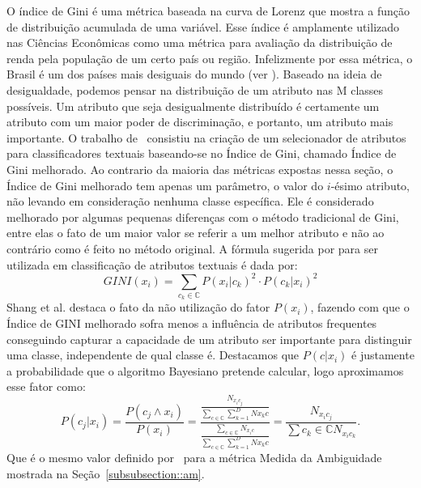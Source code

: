 O índice de Gini é uma métrica baseada na curva de Lorenz que mostra a função de distribuição acumulada de uma variável. Esse índice é amplamente utilizado nas Ciências Econômicas como uma métrica para avaliação da distribuição de renda pela população de um certo país ou região. Infelizmente por essa métrica, o Brasil é um dos países mais desiguais do mundo (ver \cite{cia-gini}). 
Baseado na ideia de desigualdade, podemos pensar na distribuição de um atributo nas M classes possíveis. Um atributo que seja desigualmente distribuído é certamente um atributo com um maior poder de discriminação, e portanto, um atributo mais importante. O trabalho de~\cite{Shang07} consistiu na criação de um selecionador de atributos para classificadores textuais baseando-se no Índice de Gini, chamado Índice de Gini melhorado. Ao contrario da maioria das métricas expostas nessa seção, o Índice de Gini melhorado tem apenas um parâmetro, o valor do $i$-ésimo atributo, não levando em consideração nenhuma classe específica. Ele é considerado melhorado por algumas pequenas diferenças com o método tradicional de Gini, entre elas o fato de um maior valor se referir a um melhor atributo e não ao contrário como é feito no método original. A fórmula sugerida por \cite{Shang07} para ser utilizada em classificação de atributos textuais é dada por:
\begin{equation}\label{eqn::gini}
   GINI(x_i) = \sum\limits_{c_k \in \mathbb{C}} P(x_i|c_k)^2 \cdot P(c_k|x_i)^2
\end{equation}
Shang et al. destaca o fato da não utilização do fator $P(x_i)$, fazendo com que o Índice de GINI melhorado sofra menos a influência de atributos frequentes conseguindo capturar a capacidade de um atributo ser importante para distinguir uma classe, independente de qual classe é. Destacamos que $P(c|x_i)$ é justamente a probabilidade que o algoritmo Bayesiano pretende calcular, logo aproximamos esse fator como:
\begin{equation}\label{eqn::gini}
   P(c_j|x_i) = \frac{  P(c_j \wedge x_i) } { P(x_i) } = \frac{ \frac{ N_{x_ic_j}}{  \sum\limits_{c \in \mathbb{C}} \sum\limits_{k=1}^{D} {Nx_kc}  } } { \frac{\sum\limits_{c \in \mathbb{C}} N_{x_ic}}{ \sum\limits_{c \in \mathbb{C}} \sum\limits_{k=1}^{D} {Nx_kc}}} = \frac{ N_{x_{i}c_{j}}}{\sum\limits{c_k \in \mathbb{C}} N_{x_{i}c_{k}}}.
\end{equation}
Que é o mesmo valor definido por~\cite{Mengle08} para a métrica Medida da Ambiguidade mostrada na Seção~\ref{subsubsection::am}.


